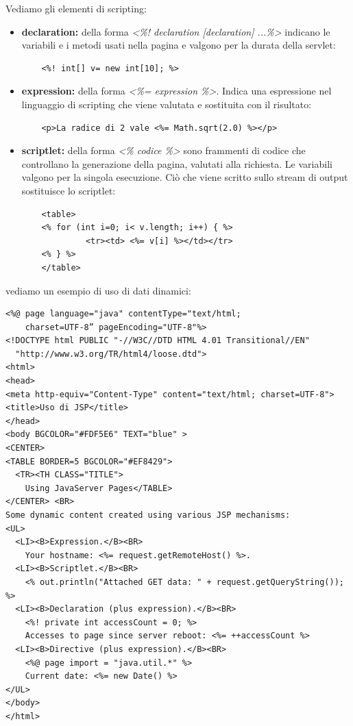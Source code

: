 \message{ !name(sd.tex)}\documentclass[a4paper,12pt, oneside]{book}
\begin{document}
Vediamo gli elementi di scripting:
\begin{itemize}
	\item \textbf{declaration:} della forma \textit{<\%! declaration [declaration] ...\%>} indicano le variabili e i metodi usati nella pagina e valgono per la durata della servlet:
	\begin{verbatim}
    <%! int[] v= new int[10]; %>
	\end{verbatim}
	\item \textbf{expression:} della forma \textit{<\%= expression \%>}. Indica una espressione nel linguaggio di scripting che viene valutata e sostituita con il risultato:
	\begin{verbatim}
    <p>La radice di 2 vale <%= Math.sqrt(2.0) %></p>
	\end{verbatim}
	\item \textbf{scriptlet:} della forma \textit{<\% codice \%>} sono frammenti di codice che controllano la generazione della pagina, valutati alla richiesta. Le variabili valgono per la singola esecuzione. Ciò che viene scritto sullo stream di output sostituisce lo scriptlet:
	\begin{verbatim}
    <table>
    <% for (int i=0; i< v.length; i++) { %>
             <tr><td> <%= v[i] %></td></tr>
    <% } %>
    </table>
	\end{verbatim}
\end{itemize}
vediamo un esempio di uso di dati dinamici:
\begin{verbatim}
<%@ page language="java" contentType="text/html;
    charset=UTF-8” pageEncoding="UTF-8"%>
<!DOCTYPE html PUBLIC "-//W3C//DTD HTML 4.01 Transitional//EN" 
  "http://www.w3.org/TR/html4/loose.dtd">
<html>
<head>
<meta http-equiv="Content-Type" content="text/html; charset=UTF-8">
<title>Uso di JSP</title>
</head>
<body BGCOLOR="#FDF5E6" TEXT="blue" >
<CENTER>
<TABLE BORDER=5 BGCOLOR="#EF8429">
  <TR><TH CLASS="TITLE">
    Using JavaServer Pages</TABLE>
</CENTER> <BR>
Some dynamic content created using various JSP mechanisms:
<UL>
  <LI><B>Expression.</B><BR>
    Your hostname: <%= request.getRemoteHost() %>.
  <LI><B>Scriptlet.</B><BR>
    <% out.println("Attached GET data: " + request.getQueryString()); %>
  <LI><B>Declaration (plus expression).</B><BR>
    <%! private int accessCount = 0; %>
    Accesses to page since server reboot: <%= ++accessCount %>
  <LI><B>Directive (plus expression).</B><BR>
    <%@ page import = "java.util.*" %>
    Current date: <%= new Date() %>
</UL>
</body>
</html>
\end{verbatim}
\end{document}
